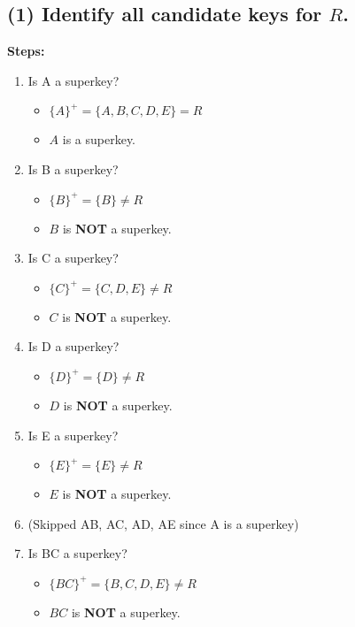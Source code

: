 \documentclass{article}[a4paper,11pt]
\begin{document}
\vspace{1em}

\subsection*{(1) Identify all candidate keys for $R$.}

\noindent 
\textbf{Steps:}

\begin{enumerate}
    \item Is A a superkey?
    \begin{itemize}
        \item $\{A\}^+ = \{A, B, C, D, E\} = R$
        \item $A$ is a superkey.
    \end{itemize}
    \item Is B a superkey?
    \begin{itemize}
        \item $\{B\}^+ = \{B\} \neq R$
        \item $B$ is \textbf{NOT} a superkey.
    \end{itemize}
    \item Is C a superkey?
    \begin{itemize}
        \item $\{C\}^+ = \{C,D,E\} \neq R$
        \item $C$ is \textbf{NOT} a superkey.
    \end{itemize}
    \item Is D a superkey?
    \begin{itemize}
        \item $\{D\}^+ = \{D\} \neq R$
        \item $D$ is \textbf{NOT} a superkey.
    \end{itemize}
    \item Is E a superkey?
    \begin{itemize}
        \item $\{E\}^+ = \{E\} \neq R$
        \item $E$ is \textbf{NOT} a superkey.
    \end{itemize}
    \item (Skipped AB, AC, AD, AE since A is a superkey)
    \item Is BC a superkey?
    \begin{itemize}
        \item $\{BC\}^+ = \{B,C,D,E\} \neq R$
        \item $BC$ is \textbf{NOT} a superkey.

\end{itemize}
\end{enumerate}
\end{document}
